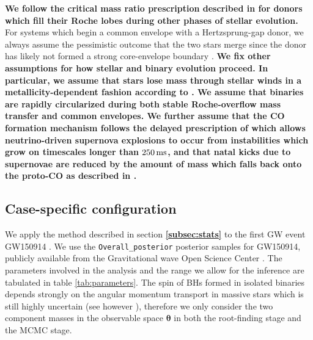 \documentclass[linenumbers,twocolumn]{aastex631}
\begin{document}
\textbf{We follow the critical mass ratio prescription 
described in \cite{Neijssel2019} for donors which fill their Roche lobes during
 other phases of stellar evolution.} 
For systems which begin a common envelope 
with a Hertzsprung-gap donor, we always assume the pessimistic outcome that the two 
stars merge since the donor has likely not formed a strong core-envelope boundary 
\citep{Ivanova2004, Belczynski2008}. \textbf{We fix other assumptions for how stellar and binary 
evolution proceed. In particular, we assume that stars lose mass through stellar winds 
in a metallicity-dependent 
fashion according to \cite{Vink2001,Vink2005}. We assume that binaries are rapidly circularized
during both stable Roche-overflow mass transfer and common envelopes.
We further assume that the CO formation mechanism follows the delayed 
prescription of \citet{Fryer2012} which allows neutrino-driven supernova explosions to 
occur from instabilities which grow on timescales longer than $250\,\rm{ms}$, 
and that natal kicks due to supernovae are reduced by the amount 
of mass which falls back onto the proto-CO
as described in \citet{Fryer2012}.}

\subsection{\textbf{Case-specific configuration}}
\label{subsec:configuration}

We apply the method described in section \textbf{\ref{subsec:stats}} to the first GW event GW150914 \citep{GW150914}.
We use the \texttt{Overall\_posterior} posterior samples for GW150914,
publicly available from the Gravitational wave Open Science Center \citep{LIGOScientific:2019lzm}. 
The parameters involved in the analysis and the range we allow for the inference are tabulated in table \ref{tab:parameters}.
The spin of BHs formed in isolated binaries depends strongly on the angular
momentum transport in massive stars which is still highly uncertain (see however \citet{Fuller2019, Bavera2020}),
therefore we only consider the two component masses in the observable space $\bm{\theta}$ in both the
root-finding stage and the MCMC stage. 
\end{document}
